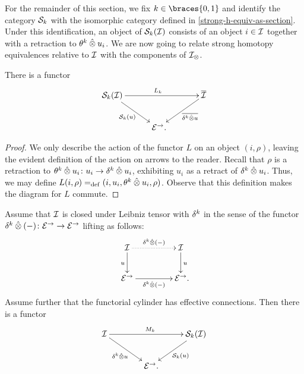 \documentclass[reqno,10pt,a4paper,oneside,draft]{amsart}
\begin{document}
For the remainder of this section, we fix $k \in \braces{0, 1}$ and identify the category $\cal{S}_k$ with the isomorphic category defined in \cref{strong-h-equiv-as-section}.
Under this identification, an object of $\cal{S}_k(\cal{I})$ consists of an object $i \in \cal{I}$ together with a retraction to $\thetak \hatotimes u_i$.
We are now going to relate strong homotopy equivalences relative to $\cal{I}$ with the components of $\cal{I}_\otimes$.

\begin{lemma} \label{lem:from-strong-hequiv}
There is a functor
\[
\xymatrix@!C{
  \cal{S}_k(\cal{I})
  \ar[dr]_{\cal{S}_k(u)}
  \ar[rr]^{L_k}
&&
  \overline{\cal{I}}
  \ar[dl]^-{\overline{\kcyl \hatotimes u}}
\\&
  \catE^\to
\rlap{.}}
\]
\end{lemma}

\begin{proof}
We only describe the action of the functor $L$ on an object $(i, \rho)$, leaving the evident definition of the action on arrows to the reader.
Recall that $\rho$ is a retraction to $\thetak \hatotimes u_i \co u_i \to \kcyl \hatotimes u_i$, exhibiting $u_i$ as a retract of $\kcyl \hatotimes u_i$.
Thus, we may define $L(i, \rho) \defeq (i, u_i, \thetak \hatotimes u_i, \rho)$.
Observe that this definition makes the diagram for $L$ commute.
\end{proof}

\begin{lemma} \label{lem:to-strong-hequiv}
Assume that $\cal{I}$ is closed under Leibniz tensor with $\kcyl$ in the sense of the functor $\kcyl \hatotimes (-) \co \catE^\to \to \catE^\to$ lifting as follows:
\begin{equation}
\label{to-strong-hequiv:0}
\begin{gathered}
\xymatrix@C+2em{
  \cal{I}
  \ar[d]_u
  \ar@{.>}[r]^{\kcyl \hatotimes (-)}
&
  \cal{I}
  \ar[d]^{u}
\\
  \catE^\to
  \ar[r]_{\kcyl \hatotimes (-)}
&
  \catE^\to
\rlap{.}}
\end{gathered}
\end{equation}
Assume further that the functorial cylinder has effective connections.
Then there is a functor
\[
\xymatrix@!C{
  \cal{I}
  \ar[dr]_{\kcyl \hatotimes u} \ar[rr]^{M_k}
&&
  \cal{S}_k(\cal{I})
  \ar[dl]^{\cal{S}_k(u)}
\\&
   \catE^\to
\rlap{.}}
\]
\end{lemma}
\end{document}
